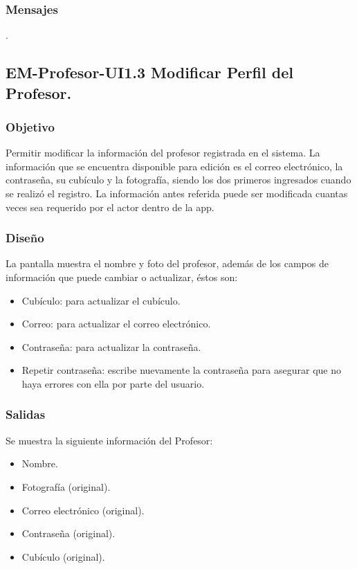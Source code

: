 \subsubsection{Mensajes}
	\noindent
	.


\subsection{EM-Profesor-UI1.3 Modificar Perfil del Profesor.}

\subsubsection{Objetivo}
	\noindent
	Permitir modificar la información del profesor registrada en el sistema. La información que se encuentra disponible para edición es el correo electrónico, la contraseña, su cubículo y la fotografía, siendo los dos primeros ingresados cuando se realizó el registro. La información antes referida puede ser modificada cuantas veces sea requerido por el actor dentro de la app.

\subsubsection{Diseño}
	\noindent
	La pantalla muestra el nombre y foto del profesor, además de los campos de información que puede cambiar o actualizar, éstos son:
	\begin{itemize} 
		\item Cubículo: para actualizar el cubículo.
		\item Correo: para actualizar el correo electrónico.
		\item Contraseña: para actualizar la contraseña.
		\item Repetir contraseña: escribe nuevamente la contraseña para asegurar que no haya errores con ella por parte del usuario.
	\end{itemize} 

\pagebreak
{}

\subsubsection{Salidas}
	\noindent
	Se muestra la siguiente información del Profesor:
	\begin{itemize}
		\item Nombre.
		\item Fotografía (original).
		\item Correo electrónico (original).
		\item Contraseña (original).
		\item Cubículo (original).
	\end{itemize}

